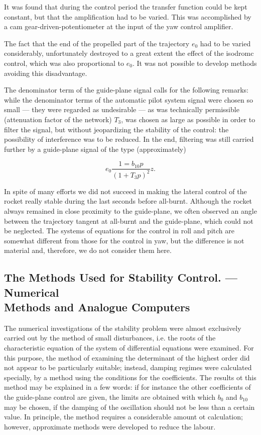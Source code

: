 \documentclass[12pt, a4paper]{article}
\begin{document}
It was found that during the control period the transfer function could be kept constant, but that the amplification had to be varied. This was accomplished by a cam gear-driven-potentiometer at the input of the yaw control amplifier.

The fact that the end of the propelled part of the trajectory $e_{0}$ had to be varied considerably, unfortunately destroyed to a great extent the effect of the isodromc control, which was also proportional to $e_{0}$. It was not possible to develop methods avoiding this disadvantage.

The denominator term of the guide-plane signal calls for the following remarks: while the denominator terms of the automatic pilot system signal were chosen so small — they were regarded as undesirable — as was technically permissible (attenuation factor of the network) $T_{3}$, was chosen as large as possible in order to filter the signal, but without jeopardizing the stability of the control: the possibility of interference was to be reduced. In the end, filtering was still carried further by a guide-plane signal of the type (approximately)

\begin{equation}
  e_{0}\frac{1=b_{10}p}{(1+T_{3}p)^{2}}z.
\end{equation}

In spite of many efforts we did not succeed in making the lateral control of the rocket really stable during the last seconds before all-burnt. Although the rocket always remained in close proximity to the guide-plane, we often observed an angle between the trajectory tangent at all-burnt and the guide-plane, which could not be neglected. The systems of equations for the control in roll and pitch are somewhat different from those for the control in yaw, but the difference is not material and, therefore, we do not consider them here.

\subsection[The Methods Used for Stability Control. — Numerical Methods and Analogue Computers]{The Methods Used for Stability Control. — Numerical\\Methods and Analogue Computers}

The numerical investigations of the stability problem were almost exclusively carried out by the method of small disturbances, i.e. the roots of the characteristic equation of the system of differential equations were examined. For this purpose, the method of examining the determinant of the highest order did not appear to be particularly suitable; instead, damping regimes were calculated specially, by a method using the conditions for the coefficients. The results ot this method may be explained in a few words: if for instance the other coefficients of the guide-plane control are given, the limits are obtained with which $b_{0}$ and $b_{10}$ may be chosen, if the damping of the oscillation should not be less than a certain value. In principle, the method requires a considerable amount ot calculation; however, approximate methods were developed to reduce the labour.
\end{document}
